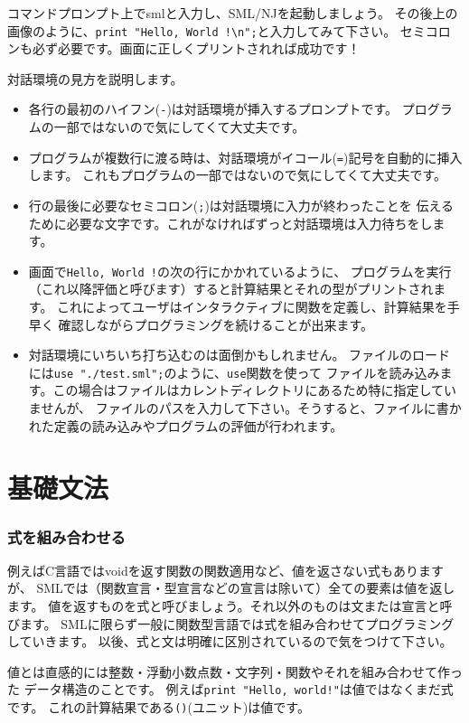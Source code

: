 \documentclass[11pt,a4paper]{article}
\begin{document}
コマンドプロンプト上でsmlと入力し、SML/NJを起動しましょう。
その後上の画像のように、\lstinline{print "Hello, World !\n";}と入力してみて下さい。
セミコロンも必ず必要です。画面に正しくプリントされれば成功です！

対話環境の見方を説明します。
\begin{itemize}
\item 各行の最初のハイフン(\lstinline{-})は対話環境が挿入するプロンプトです。
  プログラムの一部ではないので気にしてくて大丈夫です。
\item プログラムが複数行に渡る時は、対話環境がイコール(\lstinline{=})記号を自動的に挿入します。
  これもプログラムの一部ではないので気にしてくて大丈夫です。
\item 行の最後に必要なセミコロン(\lstinline{;})は対話環境に入力が終わったことを
  伝えるために必要な文字です。これがなければずっと対話環境は入力待ちをします。
\item 画面で\lstinline{Hello, World !}の次の行にかかれているように、
  プログラムを実行（これ以降評価と呼びます）すると計算結果とそれの型がプリントされます。
  これによってユーザはインタラクティブに関数を定義し、計算結果を手早く
  確認しながらプログラミングを続けることが出来ます。
\item 対話環境にいちいち打ち込むのは面倒かもしれません。
  ファイルのロードには\lstinline{use "./test.sml";}のように、\lstinline{use}関数を使って
  ファイルを読み込みます。この場合はファイルはカレントディレクトリにあるため特に指定していませんが、
  ファイルのパスを入力して下さい。そうすると、ファイルに書かれた定義の読み込みやプログラムの評価が行われます。
\end{itemize}

\part{基礎文法}

\section{式を組み合わせる}

例えばC言語ではvoidを返す関数の関数適用など、値を返さない式もありますが、
SMLでは（関数宣言・型宣言などの宣言は除いて）全ての要素は値を返します。
値を返すものを式と呼びましょう。それ以外のものは文または宣言と呼びます。
SMLに限らず一般に関数型言語では式を組み合わせてプログラミングしていきます。
以後、式と文は明確に区別されているので気をつけて下さい。

値とは直感的には整数・浮動小数点数・文字列・関数やそれを組み合わせて作った
データ構造のことです。
例えば\lstinline{print "Hello, world!"}は値ではなくまだ式です。
これの計算結果である\lstinline{()}(ユニット)は値です。
\end{document}
